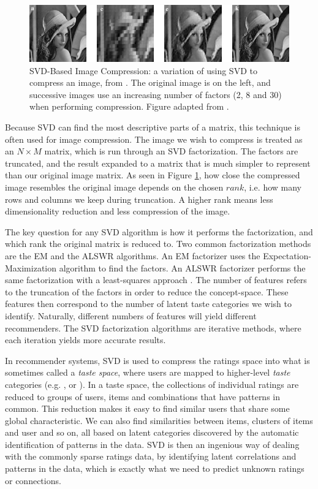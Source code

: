 \begin{figure}[t]
  \includegraphics[width=\textwidth]{../graphics/compression}
  \caption[SVD-based Image Compression]{
    SVD-Based Image Compression:
    a variation of using SVD to compress an image, from \cite{Ranade2007}.
    The original image is on the left, and successive images use an increasing number of factors (2, 8 and 30) when performing compression.
    Figure adapted from \citet[p.4]{Ranade2007}.
  }
  \label{fig:svd-image}
\end{figure}

Because SVD can find the most descriptive parts of a matrix, this technique is often used for image compression.
The image we wish to compress is treated as an $N \times M$ matrix, which is run through an SVD factorization.
The factors are truncated, and the result expanded to a matrix that is much simpler to represent
than our original image matrix. As seen in Figure \ref{fig:svd-image}, how close the compressed image resembles the original image
depends on the chosen $rank$, i.e. how many rows and columns we keep during truncation.
A higher rank means less dimensionality reduction and less compression of the image.

The key question for any SVD algorithm is how it performs the factorization,
and which rank the original matrix is reduced to.
Two common factorization methods are the EM and the ALSWR algorithms.
An EM factorizer uses the Expectation-Maximization algorithm to find the factors.
An ALSWR factorizer performs the same factorization with a least-squares approach \citep{Zhou2008}.
The number of features refers to the truncation of the factors in order to reduce the concept-space.
These features then correspond to the number of latent taste categories we wish to identify.
Naturally, different numbers of features will yield different recommenders.
The SVD factorization algorithms are iterative methods, where each iteration
yields more accurate results.

In recommender systems, SVD is used to compress the ratings space into what is sometimes called a \emph{taste space},
where users are mapped to higher-level \emph{taste} categories
(e.g. \citet[p.5]{Ahn2004}, \citet[p.4]{Brand2003} or \citet[p.2]{Liu2006}).
In a taste space,
the collections of individual ratings are reduced to groups of users, items and combinations that have patterns in common.
This reduction makes it easy to find similar users that share some global characteristic.
We can also find similarities between items, clusters of items and user and so on, all based on latent categories
discovered by the automatic identification of patterns in the data.
SVD is then an ingenious way of dealing with the commonly sparse ratings data, by identifying latent correlations and patterns in the data,
which is exactly what we need to predict unknown ratings or connections.

